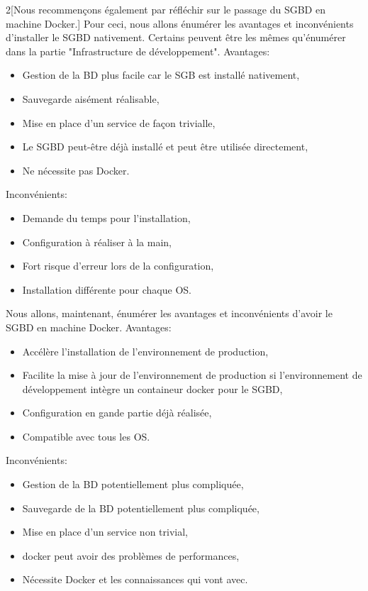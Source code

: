 \documentclass[
    iai, %
    il, %
]{heig-tb}
\begin{document}
\begin{multicols}{2}[Nous recommençons également par réfléchir sur le passage du SGBD en machine Docker.]
    Pour ceci, nous allons énumérer les avantages et inconvénients d'installer le SGBD nativement.
    Certains peuvent être les mêmes qu'énumérer dans la partie "Infrastructure de développement". %
    Avantages:
    \begin{itemize}
        \item Gestion de la BD plus facile car le SGB est installé nativement,
        \item Sauvegarde aisément réalisable,
        \item Mise en place d'un service de façon trivialle,
        \item Le SGBD peut-être déjà installé et peut être utilisée directement,
        \item Ne nécessite pas Docker.
    \end{itemize}

    Inconvénients:
    \begin{itemize}
        \item Demande du temps pour l'installation,
        \item Configuration à réaliser à la main,
        \item Fort risque d'erreur lors de la configuration,
        \item Installation différente pour chaque OS.
    \end{itemize}

    \columnbreak
    Nous allons, maintenant, énumérer les avantages et inconvénients d'avoir le SGBD en machine Docker.
    Avantages:
    \begin{itemize}
        \item Accélère l'installation de l'environnement de production,
        \item Facilite la mise à jour de l'environnement de production si l'environnement de développement intègre un containeur docker pour le SGBD,
        \item Configuration en gande partie déjà réalisée,
        \item Compatible avec tous les OS.
    \end{itemize}

    Inconvénients:
    \begin{itemize}
        \item Gestion de la BD potentiellement plus compliquée,
        \item Sauvegarde de la BD potentiellement plus compliquée,
        \item Mise en place d'un service non trivial,
        \item \Gls{docker} peut avoir des problèmes de performances, \cite{labrecque}
        \item Nécessite Docker et les connaissances qui vont avec. \cite{labrecque}
    \end{itemize}
\end{multicols}
\end{document}
